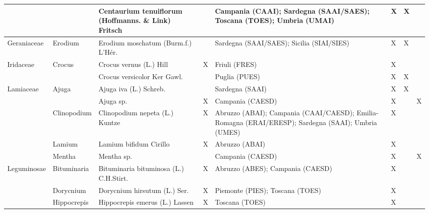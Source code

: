 \documentclass[main.tex]{subfiles}
\begin{document}
        \begin{table}[!ht]
        \centering
    \begin{tabular}[\footnotesize]{|p{2.2cm}|p{2.2cm}|p{2.2cm}|p{1.1cm}|p{1.6cm}|p{0.8cm}|p{1cm}|p{0.8cm}|}
    \hline
        ~ & ~ & Centaurium tenuiflorum (Hoffmanns. \& Link) Fritsch & ~ & Campania (CAAI); Sardegna (SAAI/SAES); Toscana (TOES); Umbria (UMAI) & X & X & ~ \\ \hline
        Geraniaceae & Erodium & Erodium moschatum (Burm.f.) L'Hér. & ~ & Sardegna (SAAI/SAES); Sicilia (SIAI/SIES) & X & X & ~ \\ \hline
        Iridaceae & Crocus & Crocus vernus (L.) Hill & X & Friuli (FRES) & X & ~ & ~ \\ \hline
        ~ & ~ & Crocus versicolor Ker Gawl. & ~ & Puglia (PUES) & X & X & ~ \\ \hline
        Lamiaceae & Ajuga & Ajuga iva (L.) Schreb. & ~ & Sardegna (SAAI) & X & X & ~ \\ \hline
        ~ & ~ & Ajuga sp. & X & Campania (CAESD) & X & ~ & X \\ \hline
        ~ & Clinopodium & Clinopodium nepeta (L.) Kuntze & X & Abruzzo (ABAI); Campania (CAAI/CAESD); Emilia-Romagna (ERAI/ERESP); Sardegna (SAAI); Umbria (UMES) & X & ~ & ~ \\ \hline
        ~ & Lamium & Lamium bifidum Cirillo & X & Abruzzo (ABAI) & X & ~ & ~ \\ \hline
        ~ & Mentha  & Mentha sp. & ~ & Campania (CAESD) & X & ~ & X \\ \hline
        Leguminosae & Bituminaria & Bituminaria bituminosa (L.) C.H.Stirt. & X & Abruzzo (ABES); Campania (CAESD) & X & ~ & ~ \\ \hline
        ~ & Dorycnium & Dorycnium hirsutum (L.) Ser. & X & Piemonte (PIES); Toscana (TOES) & X & ~ & ~ \\ \hline
        ~ & Hippocrepis & Hippocrepis emerus (L.) Lassen & X & Toscana (TOES) & X & ~ & ~ \\ \hline
        \end{tabular}
    \end{table}
    
    \clearpage
        
\end{document}

